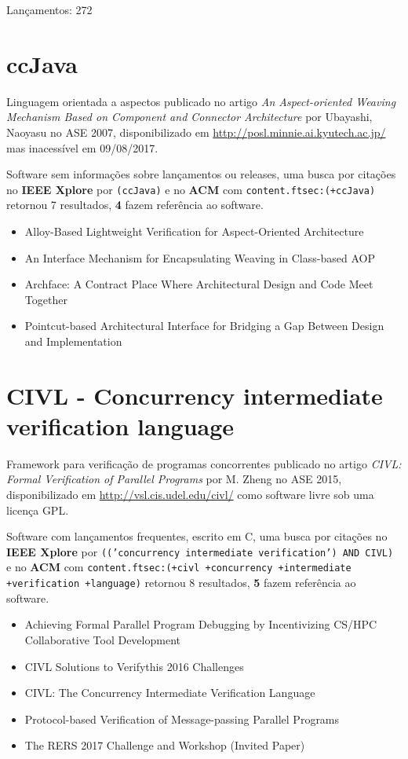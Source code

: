 Lançamentos: 272

\section{ccJava}

Linguagem orientada a aspectos
publicado no artigo {\it An Aspect-oriented Weaving Mechanism Based on Component and Connector Architecture}
por Ubayashi, Naoyasu
no ASE 2007,
disponibilizado em \url{http://posl.minnie.ai.kyutech.ac.jp/}
mas inacessível em 09/08/2017.

Software sem informações sobre lançamentos ou releases,
uma busca por citações no {\bf IEEE Xplore} por
\texttt{(ccJava)}
e no {\bf ACM} com
\texttt{content.ftsec:(+ccJava)}
retornou
7 resultados,
{\bf 4} fazem referência ao software.

\begin{itemize}
\item Alloy-Based Lightweight Verification for Aspect-Oriented Architecture
\item An Interface Mechanism for Encapsulating Weaving in Class-based AOP
\item Archface: A Contract Place Where Architectural Design and Code Meet Together
\item Pointcut-based Architectural Interface for Bridging a Gap Between Design and Implementation
\end{itemize}


\section{CIVL - Concurrency intermediate verification language}

Framework para verificação de programas concorrentes
publicado no artigo {\it CIVL: Formal Verification of Parallel Programs}
por M. Zheng
no ASE 2015,
disponibilizado em \url{http://vsl.cis.udel.edu/civl/}
como software livre
sob uma licença GPL.

Software com lançamentos frequentes,
escrito em C,
uma busca por citações no {\bf IEEE Xplore} por
\texttt{(('concurrency intermediate verification') AND CIVL)}
e no {\bf ACM} com
\texttt{content.ftsec:(+civl +concurrency +intermediate +verification +language)}
retornou
8 resultados,
{\bf 5} fazem referência ao software.

\begin{itemize}
\item Achieving Formal Parallel Program Debugging by Incentivizing CS/HPC Collaborative Tool Development
\item CIVL Solutions to Verifythis 2016 Challenges
\item CIVL: The Concurrency Intermediate Verification Language
\item Protocol-based Verification of Message-passing Parallel Programs
\item The RERS 2017 Challenge and Workshop (Invited Paper)
\end{itemize}

